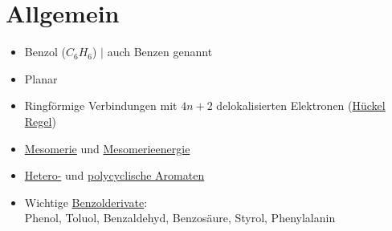 \section{Allgemein}

\begin{multicols}{2}

\begin{itemize}
    \item Benzol ($C_6H_6$) $|$ auch Benzen genannt
    \item Planar
    \item Ringförmige Verbindungen mit $4n+2$ delokalisierten Elektronen (\hyperref[sec:huckelregel]{Hückel Regel})
    \item \hyperref[sec:mesomerie]{Mesomerie} und \hyperref[sec:mesomerie]{Mesomerieenergie}
    \item \hyperref[sec:heteroaromaten]{Hetero-} und \hyperref[sec:polyaromaten]{polycyclische Aromaten}
    \item Wichtige \hyperref[sec:benzolderivate]{Benzolderivate}: \\
        Phenol, Toluol, Benzaldehyd, Benzosäure, Styrol, Phenylalanin
\end{itemize}

\end{multicols}
